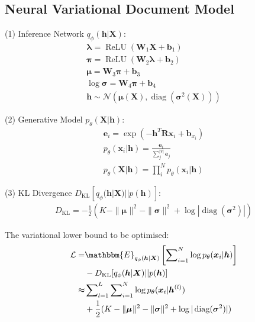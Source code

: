 \documentclass{article}
\newcommand{\nobracket}{}
\newcommand{\tmmathbf}[1]{\ensuremath{\boldsymbol{#1}}}
\newcommand{\tmop}[1]{\ensuremath{\operatorname{#1}}}
\begin{document}
\begin{appendices}
\subsection{Neural Variational Document Model}
\label{app:nvdm}
(1) Inference Network $q_{\phi} ( \tmmathbf{h} | \tmmathbf{X} \nobracket)$:
\begin{eqnarray}
  & \tmmathbf{\lambda}_{} = \tmop{ReLU} ( \tmmathbf{W}_1
  \tmmathbf{X}+\tmmathbf{b}_1)  & \\
  & \tmmathbf{\pi} = \tmop{ReLU} ( \tmmathbf{W}_2 \tmmathbf{\lambda}_{}
  +\tmmathbf{b}_2) & \\
  & \tmmathbf{\mu} =\tmmathbf{W}_3 \tmmathbf{\pi} +\tmmathbf{b}_3  & \\
  & \log \tmmathbf{\sigma} =\tmmathbf{W}_4 \tmmathbf{\pi} +\tmmathbf{b}_4  &
  \\
  & \tmmathbf{h} \sim \mathcal{N} ( \tmmathbf{\mu} ( \tmmathbf{X}),
  \tmop{diag} ( \tmmathbf{\sigma}^2 ( \tmmathbf{X}))) &   
\end{eqnarray}

(2) Generative Model $p_{\theta} ( \tmmathbf{X} | \tmmathbf{h} \nobracket)$:
\begin{eqnarray}
  & \tmmathbf{\tmmathbf{e}}_i = \exp ( -\tmmathbf{h}^T
  \tmmathbf{R}\tmmathbf{x}_i +\tmmathbf{b}_{x_i})  & \\
  & p_{\theta} ( \tmmathbf{x}_i | \tmmathbf{h} \nobracket) =
  \frac{\tmmathbf{e}_i}{\sum^{| V |}_j \tmmathbf{e}_j} & \\
  & p_{\theta} ( \tmmathbf{X} | \tmmathbf{h} \nobracket) = \prod_i^N
  p_{\theta} ( \tmmathbf{x}_i | \tmmathbf{h} \nobracket) & 
\end{eqnarray}

(3) KL Divergence $D_{\tmop{KL}} [ q_{\phi} ( \tmmathbf{h} | \tmmathbf{X}
\nobracket) | | p ( \tmmathbf{h})]$:
\begin{eqnarray}
  & D_{\tmop{KL}} = - \frac{1}{2}  (K - \| \tmmathbf{\mu}_{} \|^2 - \| 
  \tmmathbf{\sigma} \|^2 + \log | \tmop{diag} ( \tmmathbf{\sigma}^2) |) & 
\end{eqnarray}

The variational lower bound to be optimised:
\begin{align}
  \nonumber \mathcal{L} = & \mathbbm{E}_{q_{\phi} ( \tmmathbf{h} | \tmmathbf{X}
  \nobracket)} \left[ \sum\nolimits_{i = 1}^N \log p_{\theta} ( \tmmathbf{x}_i |
  \tmmathbf{h} \nobracket) \right] \\
  &- D_{\tmop{KL}} [ q_{\phi} ( \tmmathbf{h} |
  \tmmathbf{X} \nobracket) | | p ( \tmmathbf{h})]\\
  \nonumber \thickapprox & \sum\nolimits_{l = 1}^L \sum\nolimits_{i = 1}^N \log p_{\theta} (
  \tmmathbf{x}_i | \tmmathbf{h} \nobracket^{( l)})  \\
  & + \frac{1}{2}  (K - \|
  \tmmathbf{\mu}_{} \|^2 - \|  \tmmathbf{\sigma} \|^2 + \log | \tmop{diag} (
  \tmmathbf{\sigma}^2) |)
\end{align}


\end{appendices}
\end{document}
